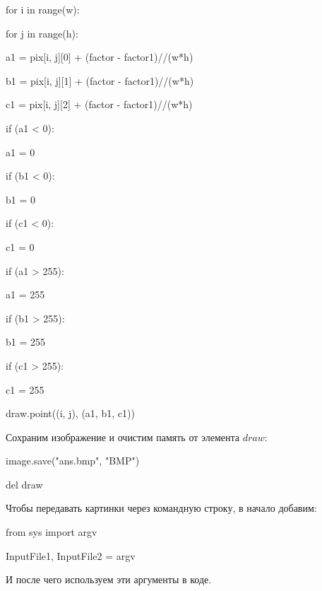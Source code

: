 \documentclass{article}
\newcommand\tab[1][1cm]{\hspace*{#1}}
\begin{document}
{
for i in range(w):

\tab[1cm]	for j in range(h):

\tab[2cm]		a1 = pix[i, j][0] + (factor - factor1)//(w*h)

\tab[2cm]		b1 = pix[i, j][1] + (factor - factor1)//(w*h)

\tab[2cm]		c1 = pix[i, j][2] + (factor - factor1)//(w*h)

\tab[2cm]		if (a1 < 0):

\tab[3cm]			a1 = 0

\tab[2cm]		if (b1 < 0):

\tab[3cm]			b1 = 0

\tab[2cm]		if (c1 < 0):

\tab[3cm]			c1 = 0

\tab[2cm]		if (a1 > 255):

\tab[3cm]			a1 = 255

\tab[2cm]		if (b1 > 255):

\tab[3cm]			b1 = 255

\tab[2cm]		if (c1 > 255):

\tab[3cm]			c1 = 255

draw.point((i, j), (a1, b1, c1))}

Сохраним изображение и очистим память от элемента $draw$:	
	
{
image.save("ans.bmp", "BMP")

del draw
 }
 
Чтобы передавать картинки через командную строку, в начало добавим: 
 
{
from sys import argv

InputFile1, InputFile2 = argv}

И после чего используем эти аргументы в коде.
  
\end{document}
